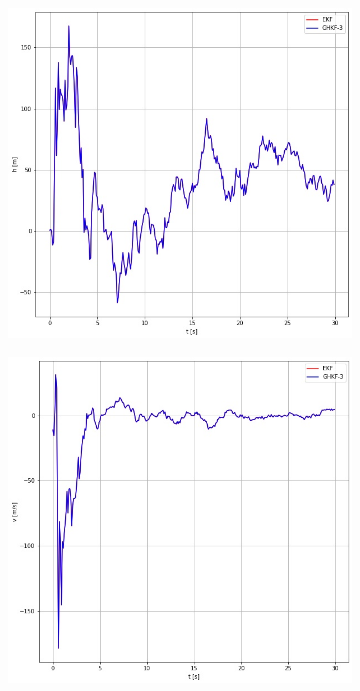 \begin{figure}
	\centering
	\begin{subfigure}[b]{0.4\linewidth}
		\includegraphics[width=\linewidth]{ballistic_tracking_h_errors.jpg}
		\caption{}
		\label{fig:ballistic_errors_h}
	\end{subfigure}
	\begin{subfigure}[b]{0.4\linewidth}
		\includegraphics[width=\linewidth]{ballistic_tracking_v_errors.jpg}

\end{subfigure}
\end{figure}
